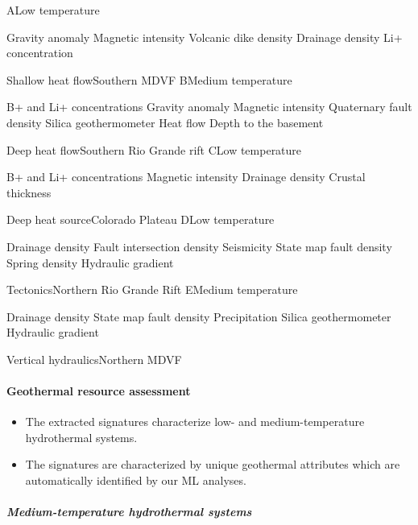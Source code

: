 \documentclass[11pt]{article}
\providecommand{\tightlist}{%
      \setlength{\itemsep}{0pt}\setlength{\parskip}{0pt}}
\begin{document}
\textbar A\textbar Low temperature\textbar{}

Gravity anomaly Magnetic intensity Volcanic dike density Drainage
density Li+ concentration

\textbar Shallow heat flow\textbar Southern MDVF\textbar{}
\textbar B\textbar Medium temperature\textbar{}

B+ and Li+ concentrations Gravity anomaly Magnetic intensity Quaternary
fault density Silica geothermometer Heat flow Depth to the basement

\textbar Deep heat flow\textbar Southern Rio Grande rift\textbar{}
\textbar C\textbar Low temperature\textbar{}

B+ and Li+ concentrations Magnetic intensity Drainage density Crustal
thickness

\textbar Deep heat source\textbar Colorado Plateau\textbar{}
\textbar D\textbar Low temperature\textbar{}

Drainage density Fault intersection density Seismicity State map fault
density Spring density Hydraulic gradient

\textbar Tectonics\textbar Northern Rio Grande Rift \textbar{}
\textbar E\textbar Medium temperature\textbar{}

Drainage density State map fault density Precipitation Silica
geothermometer Hydraulic gradient

\textbar Vertical hydraulics\textbar Northern MDVF\textbar{}

    \hypertarget{geothermal-resource-assessment}{%
\paragraph{Geothermal resource
assessment}\label{geothermal-resource-assessment}}

\begin{itemize}
\tightlist
\item
  The extracted signatures characterize low- and medium-temperature
  hydrothermal systems.
\item
  The signatures are characterized by unique geothermal attributes which
  are automatically identified by our ML analyses.
\end{itemize}

\hypertarget{medium-temperature-hydrothermal-systems}{%
\subparagraph{Medium-temperature hydrothermal
systems}\label{medium-temperature-hydrothermal-systems}}
\end{document}
